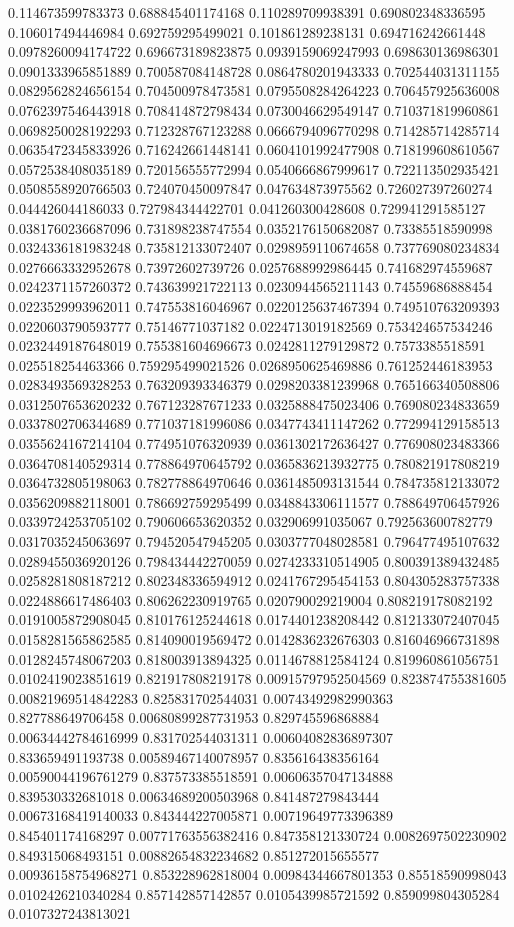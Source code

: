 \begin{table}
\begin{tabu}
\begin{sparkline}{10}
0.114673599783373 0.688845401174168 0.110289709938391 0.690802348336595 0.106017494446984 0.692759295499021 0.101861289238131 0.694716242661448 0.0978260094174722 0.696673189823875 0.0939159069247993 0.698630136986301 0.0901333965851889 0.700587084148728 0.0864780201943333 0.702544031311155 0.0829562824656154 0.704500978473581 0.0795508284264223 0.706457925636008 0.0762397546443918 0.708414872798434 0.0730046629549147 0.710371819960861 0.0698250028192293 0.712328767123288 0.0666794096770298 0.714285714285714 0.0635472345833926 0.716242661448141 0.0604101992477908 0.718199608610567 0.0572538408035189 0.720156555772994 0.0540666867999617 0.722113502935421 0.0508558920766503 0.724070450097847 0.047634873975562 0.726027397260274 0.044426044186033 0.727984344422701 0.041260300428608 0.729941291585127 0.0381760236687096 0.731898238747554 0.0352176150682087 0.73385518590998 0.0324336181983248 0.735812133072407 0.0298959110674658 0.737769080234834 0.0276663332952678 0.73972602739726 0.0257688992986445 0.741682974559687 0.0242371157260372 0.743639921722113 0.0230944565211143 0.74559686888454 0.0223529993962011 0.747553816046967 0.0220125637467394 0.749510763209393 0.0220603790593777 0.75146771037182 0.0224713019182569 0.753424657534246 0.0232449187648019 0.755381604696673 0.0242811279129872 0.7573385518591 0.025518254463366 0.759295499021526 0.0268950625469886 0.761252446183953 0.0283493569328253 0.763209393346379 0.0298203381239968 0.765166340508806 0.0312507653620232 0.767123287671233 0.0325888475023406 0.769080234833659 0.0337802706344689 0.771037181996086 0.0347743411147262 0.772994129158513 0.0355624167214104 0.774951076320939 0.0361302172636427 0.776908023483366 0.0364708140529314 0.778864970645792 0.0365836213932775 0.780821917808219 0.0364732805198063 0.782778864970646 0.0361485093131544 0.784735812133072 0.0356209882118001 0.786692759295499 0.0348843306111577 0.788649706457926 0.0339724253705102 0.790606653620352 0.032906991035067 0.792563600782779 0.0317035245063697 0.794520547945205 0.0303777048028581 0.796477495107632 0.0289455036920126 0.798434442270059 0.0274233310514905 0.800391389432485 0.0258281808187212 0.802348336594912 0.0241767295454153 0.804305283757338 0.0224886617486403 0.806262230919765 0.020790029219004 0.808219178082192 0.0191005872908045 0.810176125244618 0.0174401238208442 0.812133072407045 0.0158281565862585 0.814090019569472 0.0142836232676303 0.816046966731898 0.0128245748067203 0.818003913894325 0.0114678812584124 0.819960861056751 0.0102419023851619 0.821917808219178 0.00915797952504569 0.823874755381605 0.00821969514842283 0.825831702544031 0.00743492982990363 0.827788649706458 0.00680899287731953 0.829745596868884 0.00634442784616999 0.831702544031311 0.00604082836897307 0.833659491193738 0.00589467140078957 0.835616438356164 0.00590044196761279 0.837573385518591 0.00606357047134888 0.839530332681018 0.00634689200503968 0.841487279843444 0.00673168419140033 0.843444227005871 0.00719649773396389 0.845401174168297 0.00771763556382416 0.847358121330724 0.0082697502230902 0.849315068493151 0.00882654832234682 0.851272015655577 0.00936158754968271 0.853228962818004 0.00984344667801353 0.85518590998043 0.0102426210340284 0.857142857142857 0.0105439985721592 0.859099804305284 0.0107327243813021 
\end{sparkline}
\end{tabu}
\end{table}
